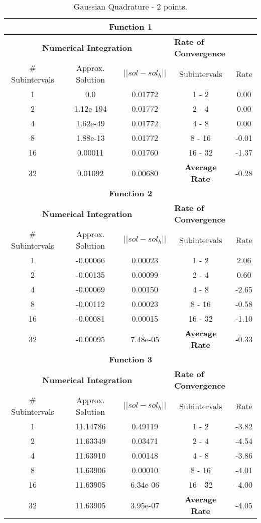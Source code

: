 \begin{table}[H]
    \centering
    \caption{Gaussian Quadrature - 2 points.}
    \begin{tabular}{ccccc}
    \hline
    \multicolumn{5}{c}{\textbf{Function 1}} \\
    \hline
    \multicolumn{3}{c}{\textbf{Numerical Integration}} & \multicolumn{2}{l}{\textbf{Rate of Convergence}} \\\hline
    \# Subintervals & Approx. Solution & $|| sol - sol_h ||$ & Subintervals & Rate \\\hline
    1 & 0.0 & 0.01772 & 1 - 2 &  0.00\\
    2 & 1.12e-194 & 0.01772 & 2 - 4 &  0.00\\
    4 & 1.62e-49 & 0.01772 & 4 - 8 &  0.00\\
    8 & 1.88e-13 & 0.01772 & 8 - 16 &  -0.01\\
    16 & 0.00011 & 0.01760 & 16 - 32 &  -1.37\\
    32 & 0.01092 & 0.00680 & \textbf{Average Rate} & -0.28\\ \hline
    \multicolumn{5}{c}{\textbf{Function 2}} \\
    \hline
    \multicolumn{3}{c}{\textbf{Numerical Integration}} & \multicolumn{2}{l}{\textbf{Rate of Convergence}} \\\hline
    \# Subintervals & Approx. Solution & $|| sol - sol_h ||$ & Subintervals & Rate \\\hline
    1 & -0.00066 & 0.00023 & 1 - 2 &  2.06\\
    2 & -0.00135 & 0.00099 & 2 - 4 &  0.60\\
    4 & -0.00069 & 0.00150 & 4 - 8 &  -2.65\\
    8 & -0.00112 & 0.00023 & 8 - 16 &  -0.58\\
    16 & -0.00081 & 0.00015 & 16 - 32 &  -1.10\\
    32 & -0.00095 & 7.48e-05 & \textbf{Average Rate} & -0.33\\ \hline
    \multicolumn{5}{c}{\textbf{Function 3}} \\
    \hline
    \multicolumn{3}{c}{\textbf{Numerical Integration}} & \multicolumn{2}{l}{\textbf{Rate of Convergence}} \\\hline
    \# Subintervals & Approx. Solution & $|| sol - sol_h ||$ & Subintervals & Rate \\\hline
    1 & 11.14786 & 0.49119 & 1 - 2 &  -3.82\\
    2 & 11.63349 & 0.03471 & 2 - 4 &  -4.54\\
    4 & 11.63910 & 0.00148 & 4 - 8 &  -3.86\\
    8 & 11.63906 & 0.00010 & 8 - 16 &  -4.01\\
    16 & 11.63905 & 6.34e-06 & 16 - 32 &  -4.00\\
    32 & 11.63905 & 3.95e-07 & \textbf{Average Rate} & -4.05\\ \hline
\end{tabular}
\end{table}

